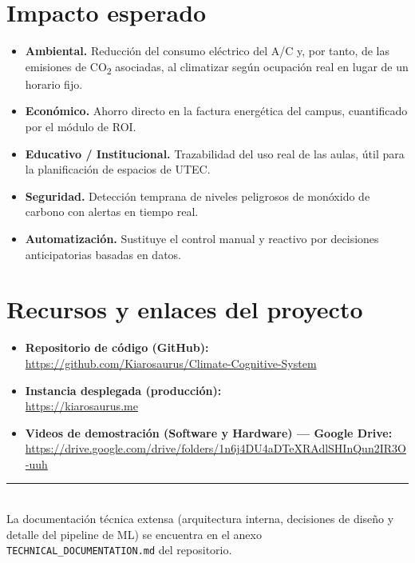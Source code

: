 \documentclass[11pt,a4paper]{article}
\begin{document}
\section{Impacto esperado}

\begin{itemize}
\item \textbf{Ambiental.} Reducción del consumo eléctrico del A/C y, por tanto,
de las emisiones de CO\textsubscript{2} asociadas, al climatizar según ocupación
real en lugar de un horario fijo.
\item \textbf{Económico.} Ahorro directo en la factura energética del campus,
cuantificado por el módulo de ROI.
\item \textbf{Educativo / Institucional.} Trazabilidad del uso real de las aulas,
útil para la planificación de espacios de UTEC.
\item \textbf{Seguridad.} Detección temprana de niveles peligrosos de monóxido
de carbono con alertas en tiempo real.
\item \textbf{Automatización.} Sustituye el control manual y reactivo por
decisiones anticipatorias basadas en datos.
\end{itemize}

\section{Recursos y enlaces del proyecto}\label{sec:recursos}

\begin{itemize}
\item \textbf{Repositorio de código (GitHub):} \\
\href{https://github.com/Kiarosaurus/Climate-Cognitive-System}{https://github.com/Kiarosaurus/Climate-Cognitive-System}
\item \textbf{Instancia desplegada (producción):} \\
\href{https://kiarosaurus.me}{https://kiarosaurus.me}
\item \textbf{Videos de demostración (Software y Hardware) --- Google Drive:} \\
\href{https://drive.google.com/drive/folders/1n6j4DU4aDTeXRAdlSHInQun2IR3O-uuh?usp=sharing}{https://drive.google.com/drive/folders/1n6j4DU4aDTeXRAdlSHInQun2IR3O-uuh}
\end{itemize}

\newpage



\vspace{0.6cm}
\noindent\rule{\linewidth}{0.4pt}\\
{\footnotesize La documentación técnica extensa (arquitectura interna, decisiones
de diseño y detalle del pipeline de ML) se encuentra en el anexo
\texttt{TECHNICAL\_DOCUMENTATION.md} del repositorio.}
\end{document}
